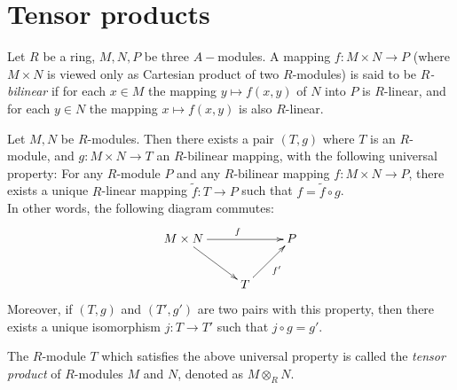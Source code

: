 \section{Tensor products}
\label{section-tensor-product}

\begin{definition}
\label{definition-bilinear}
Let $R$ be a ring, $M, N, P$ be three $A-$modules.
A mapping $f : M \times N\rightarrow P$ (where $M\times N$
is viewed only as Cartesian product of two $R$-modules) is said to be
{\it $R$-bilinear} if for each $x \in M$
the mapping $y\mapsto f(x, y)$ of $N$ into $P$ is $R$-linear, and for each
$y\in N$ the mapping $x\mapsto f(x, y)$ is also $R$-linear.
\end{definition}

\begin{lemma}
\label{lemma-tensor-product}
Let $M, N$ be $R$-modules. Then there exists a pair $(T, g)$
where $T$ is an $R$-module, and
$g : M\times N \rightarrow T$ an $R$-bilinear
mapping, with the following universal property:
For any $R$-module $P$ and any $R$-bilinear mapping
$f : M\times N \rightarrow P$, there
exists a unique $R$-linear
mapping $\tilde{f} : T\rightarrow
P$ such that $f = \tilde{f} \circ g$. \\
In other words, the following diagram commutes:
$$
\xymatrix{
M\times N \ar[rr]^{f} \ar[dr] & &P\\
&T \ar[ur]_{f'}
}
$$
Moreover, if $(T, g)$ and $(T', g')$
are two pairs with this property, then there
exists a unique isomorphism
$j : T\rightarrow T'$ such that $j\circ g = g'$.
\end{lemma}

\noindent
The $R$-module $T$ which satisfies the above universal property is called
the  \textit{tensor product} of $R$-modules $M$ and $N$, denoted as
$M\otimes_{R} N$.

